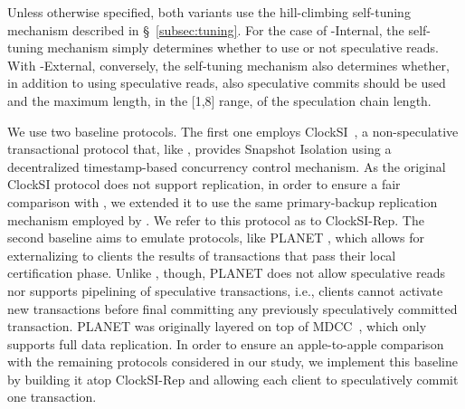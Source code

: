 
Unless otherwise specified, both \specula variants use the hill-climbing self-tuning mechanism described in \S~\ref{subsec:tuning}. For the case of {\specula}-Internal, the self-tuning mechanism simply determines whether to use or not speculative reads. With {\specula}-External, conversely, the self-tuning mechanism also determines whether, in addition to using speculative reads, also speculative commits should be used and the maximum length, in the [1,8] range, of the speculation chain length.


We use two baseline protocols. The first one employs ClockSI~\cite{clocksi}, a non-speculative  transactional protocol that, like \specula, provides Snapshot Isolation using a decentralized timestamp-based concurrency control mechanism. As the original ClockSI protocol does not support replication, in order to ensure a fair comparison with \specula, we extended it to use the same primary-backup replication mechanism employed by \specula. We refer to this protocol as to ClockSI-Rep. The second baseline aims to emulate protocols, like PLANET \cite{pang2014planet}, which allows for externalizing  to clients  the results of transactions that pass their local certification phase. Unlike \specula, though, PLANET does not allow speculative reads nor supports pipelining of speculative transactions, i.e., clients cannot activate new transactions before final committing any previously speculatively committed transaction. PLANET was originally layered on top of MDCC~\cite{mdcc}, which only supports full data replication. In order to ensure an apple-to-apple comparison with the remaining protocols considered in our study, we implement this baseline by building it atop ClockSI-Rep and allowing each client to speculatively commit one transaction.

